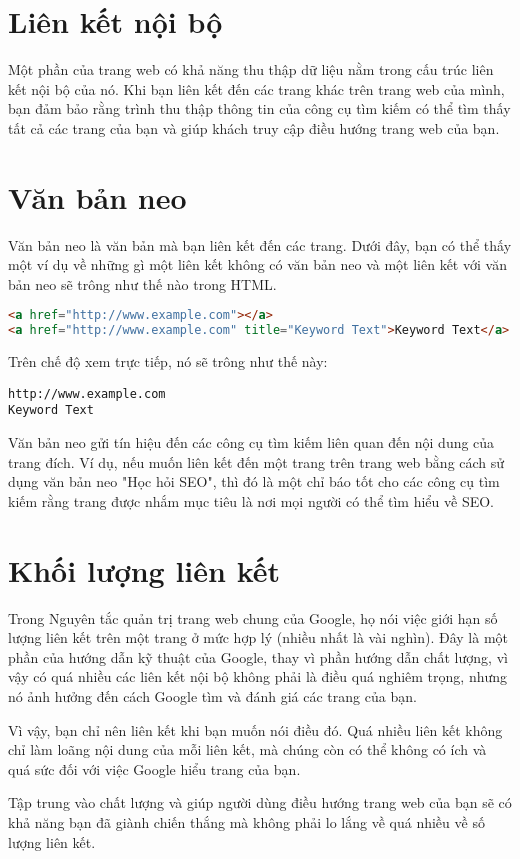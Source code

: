\section{Liên kết nội bộ}
Một phần của trang web có khả năng thu thập dữ liệu nằm trong cấu trúc liên kết nội bộ của nó. Khi bạn liên kết đến các trang khác trên trang web của mình, bạn đảm bảo rằng trình thu thập thông tin của công cụ tìm kiếm có thể tìm thấy tất cả các trang của bạn và giúp khách truy cập điều hướng trang web của bạn.
\section{Văn bản neo}
Văn bản neo là văn bản mà bạn liên kết đến các trang. Dưới đây, bạn có thể thấy một ví dụ về những gì một liên kết không có văn bản neo và một liên kết với văn bản neo sẽ trông như thế nào trong HTML.
\begin{lstlisting}[language=html]
<a href="http://www.example.com"></a>
<a href="http://www.example.com" title="Keyword Text">Keyword Text</a>
\end{lstlisting}
\par
Trên chế độ xem trực tiếp, nó sẽ trông như thế này:
\begin{lstlisting}
http://www.example.com
Keyword Text
\end{lstlisting}
\par
Văn bản neo gửi tín hiệu đến các công cụ tìm kiếm liên quan đến nội dung của trang đích. Ví dụ, nếu muốn liên kết đến một trang trên trang web bằng cách sử dụng văn bản neo "Học hỏi SEO", thì đó là một chỉ báo tốt cho các công cụ tìm kiếm rằng trang được nhắm mục tiêu là nơi mọi người có thể tìm hiểu về SEO.
\section{Khối lượng liên kết}
Trong Nguyên tắc quản trị trang web chung của Google, họ nói việc giới hạn số lượng liên kết trên một trang ở mức hợp lý (nhiều nhất là vài nghìn). Đây là một phần của hướng dẫn kỹ thuật của Google, thay vì phần hướng dẫn chất lượng, vì vậy có quá nhiều các liên kết nội bộ không phải là điều quá nghiêm trọng, nhưng nó ảnh hưởng đến cách Google tìm và đánh giá các trang của bạn.
\par
Vì vậy, bạn chỉ nên liên kết khi bạn muốn nói điều đó. Quá nhiều liên kết không chỉ làm loãng nội dung của mỗi liên kết, mà chúng còn có thể không có ích và quá sức đối với việc Google hiểu trang của bạn.
\par
Tập trung vào chất lượng và giúp người dùng điều hướng trang web của bạn sẽ có khả năng bạn đã giành chiến thắng mà không phải lo lắng về quá nhiều về số lượng liên kết.
